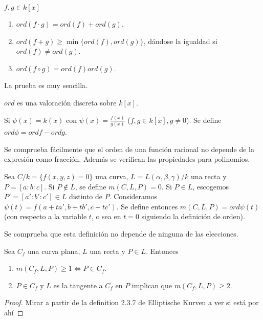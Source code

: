 \documentclass[CR.tex]{subfiles}
\begin{document}
\begin{lemma}
$f,g\in k[x]$
\begin{enumerate}
\item $ord(f\cdot g)=ord(f)+ord(g)$.
\item $ord(f+g)\geq\min\{ord(f),ord(g)\}$, dándose la igualdad si $ord(f)\neq ord(g)$.
\item $ord(f\circ g)=ord(f)ord(g)$. 
\end{enumerate}
\end{lemma}
La prueba es muy sencilla.

\begin{nota}
$ord$ es una valoración discreta sobre $k[x]$. 
\end{nota}

\begin{defi}
Si $\psi(x)=k(x)$ con $\psi(x)=\frac{f(x)}{g(x)}$ ($f,g\in k[x], g\neq 0$). Se define $ord\phi=ord f-ord g$.
\end{defi}
Se comprueba fácilmente que el orden de una función racional no depende de la expresión como fracción. Además se verifican las propiedades para polinomios.

\begin{defi}
Sea $C/k=\{f(x,y,z)=0\}$ una curva, $L=L(\alpha,\beta,\gamma)/k$ una recta y $P=[a:b:c]$. Si $P\notin L$, se define $m(C,L,P)=0$. Si $P\in L$, escogemos $P'=[a':b':c']\in L$ distinto de $P$. Consideramos $\psi(t)=f(a+ta',b+tb',c+tc')$. Se define entonces $m(C,L,P)=ord\psi(t)$ (con respecto a la variable $t$, o sea en $t=0$ siguiendo la definición de orden). 
\end{defi}

Se comprueba que esta definición no depende de ninguna de las elecciones.

\begin{lemma}
Sea $C_f$ una curva plana, $L$ una recta y $P\in L$. Entonces 
\begin{enumerate}
\item $m(C_f,L,P)\geq 1\Leftrightarrow P\in C_f$. 
\item $P\in C_f$ y $L$ es la tangente a $C_f$ en $P$ implican que $m(C_f,L,P)\geq 2$.
\end{enumerate}
\end{lemma}
\begin{proof}
Mirar a partir de la definition 2.3.7 de Elliptische Kurven a ver si está por ahí
\end{proof}
\end{document}
